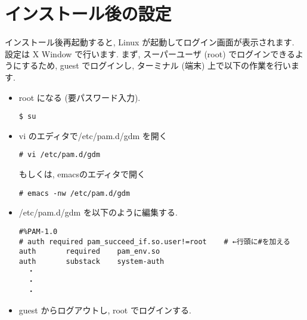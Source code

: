 \documentclass{jarticle}
\begin{document}

\section{インストール後の設定}

インストール後再起動すると, Linux が起動してログイン画面が表示されます.
設定は X Window で行います. まず, スーパーユーザ (root) でログインできるようにするため,
guest でログインし, ターミナル (端末) 上で以下の作業を行います.
\begin{itemize}
	\item root になる (要パスワード入力).
\begin{verbatim}
$ su
\end{verbatim}
	\item vi のエディタで/etc/pam.d/gdm を開く
\begin{verbatim}
# vi /etc/pam.d/gdm
\end{verbatim}
もしくは, emacsのエディタで開く
\begin{verbatim}
# emacs -nw /etc/pam.d/gdm
\end{verbatim}
	\item /etc/pam.d/gdm を以下のように編集する.
\begin{verbatim}
#%PAM-1.0
# auth required pam_succeed_if.so.user!=root    # ←行頭に#を加える
auth       required    pam_env.so
auth       substack    system-auth
  ・
  ・
  ・
\end{verbatim}
	\item guest からログアウトし, root でログインする.
\end{itemize}
\end{document}

